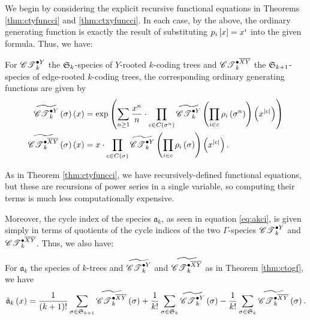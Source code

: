 \documentclass[sectionflow,singlespace,twoside,boldmathhdr,draft]{brandiss} %
\numberwithin{section}{chapter}
\numberwithin{figure}{chapter}
\begin{document}
We begin by considering the explicit recursive functional equations in Theorems \ref{thm:ctyfuncci} and \ref{thm:ctxyfuncci}.
In each case, by the above, the ordinary generating function is exactly the result of substituting $p_{i} \sbrac{x} = x^{i}$ into the given formula.
Thus, we have:
\begin{theorem}
  \label{thm:ctogf}
  For $\pointed[Y]{\specname{CT}}_{k}$ the $\symgp{k}$-species of $Y$-rooted $k$-coding trees and $\pointed[\overline{XY}]{\specname{CT}}_{k}$ the $\symgp{k+1}$-species of edge-rooted $k$-coding trees, the corresponding ordinary generating functions are given by
  \begin{align}
    \widetilde{\pointed[Y]{\specname{CT}}_{k}} \pbrac{\sigma} \pbrac{x} &= \exp \pbrac{ \sum_{n \geq 1} \frac{x^{n}}{n} \cdot \prod_{c \in C \pbrac{\sigma^{n}}} \widetilde{\pointed[Y]{\specname{CT}}_{k}} \pbrac{\prod_{i \in c} \rho_{i} \pbrac{\sigma^{n}}} \pbrac{x^{\abs{c}}}} \label{eq:ctyogf} \\
    \widetilde{\pointed[\overline{XY}]{\specname{CT}}_{k}} \pbrac{\sigma} \pbrac{x} &= x \cdot \prod_{c \in C \pbrac{\sigma}} \widetilde{\pointed[Y]{\specname{CT}}_{k}} \pbrac{\prod_{i \in c} \rho_{i} \pbrac{\sigma}} \pbrac{x^{\abs{c}}}. \label{eq:ctxyogf}
  \end{align}
\end{theorem}
As in Theorem \ref{thm:ctyfuncci}, we have recursively-defined functional equations, but these are recursions of power series in a single variable, so computing their terms is much less computationally expensive.

Moreover, the cycle index of the species $\mathfrak{a}_{k}$, as seen in equation \eqref{eq:akci}, is given simply in terms of quotients of the cycle indices of the two $\Gamma$-species $\pointed[Y]{\specname{CT}}_{k}$ and $\pointed[\overline{XY}]{\specname{CT}}_{k}$.
Thus, we also have:
\begin{theorem}
  \label{thm:akogf}
  For $\mathfrak{a}_{k}$ the species of $k$-trees and $\widetilde{\pointed[Y]{\specname{CT}}_{k}}$ and $\widetilde{\pointed[\overline{XY}]{\specname{CT}}_{k}}$ as in Theorem \ref{thm:ctogf}, we have
  \begin{equation}
    \label{eq:akogf}
    \tilde{\mathfrak{a}}_{k} \pbrac{x} = \frac{1}{\pbrac{k+1}!} \sum_{\sigma \in \symgp{k+1}} \widetilde{\pointed[\overline{XY}]{\specname{CT}}_{k}} \pbrac{\sigma} + \frac{1}{k!} \sum_{\sigma \in \symgp{k}} \widetilde{\pointed[Y]{\specname{CT}}_{k}} \pbrac{\sigma} - \frac{1}{k!} \sum_{\sigma \in \symgp{k}} \widetilde{\pointed[\overline{XY}]{\specname{CT}}_{k}} \pbrac{\sigma}.
  \end{equation}
\end{theorem}
\end{document}
